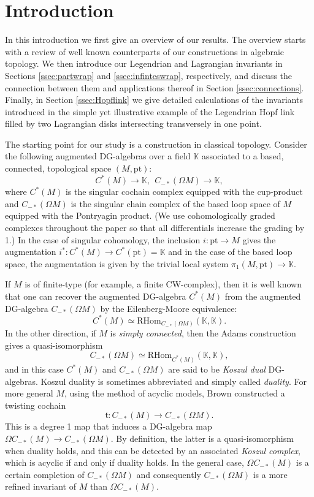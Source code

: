 \documentclass{gtpart}
\newcommand{\K}{\mathbb{K}}
\renewcommand{\t}{\mathfrak{t}}
\begin{document}
\section{Introduction}
In this introduction we first give an overview of our results. The overview starts with a review of
well known counterparts of our constructions in algebraic topology. We then introduce our Legendrian
and Lagrangian invariants in Sections \ref{ssec:partwrap} and \ref{ssec:infinteswrap}, respectively,
and discuss the connection between them and applications thereof in Section \ref{ssec:connections}.  Finally, in Section \ref{ssec:Hopflink} we give detailed calculations of the invariants introduced in the simple yet illustrative example of the Legendrian Hopf link filled by two Lagrangian disks intersecting transversely in one point.
  
The starting point for our study is a construction in classical topology. 
Consider the following augmented DG-algebras over a field $\mathbb{K}$ associated to a based, connected, topological space $(M,\mathrm{pt})$: 
\[ C^*(M) \to \K , \ \ C_{-*}(\Omega M) \to \K, \]
where $C^*(M)$ is the singular cochain complex equipped with the cup-product and $C_{-*}(\Omega M)$
is the singular chain complex of the based loop space of $M$ equipped with the Pontryagin product. (We use
cohomologically graded complexes throughout the paper so that all differentials increase the grading by 1.) In the case of
singular cohomology, the inclusion $i\colon \mathrm{pt} \to M$  gives the augmentation $i^*\colon C^*(M) \to C^*(\mathrm{pt}) = \K$ and
in the case of the based loop space, the augmentation is given by the trivial local system $\pi_1(M,\mathrm{pt}) \to \K$. 

If $M$ is of finite-type (for example, a finite CW-complex), then it is well known that one can
recover the augmented DG-algebra $C^*(M)$ from the augmented DG-algebra $C_{-*}(\Omega M)$ by
the Eilenberg-Moore equivalence:
\[ C^*(M) \simeq \mathrm{RHom}_{C_{-*}(\Omega M)} (\K, \K). \] 
In the other direction, if $M$ is \emph{simply connected}, then the Adams construction gives a quasi-isomorphism 
\[ C_{-*}(\Omega M) \simeq \mathrm{RHom}_{C^*(M)} (\K,\K), \]
and in this case $C^*(M)$ and $C_{-*}(\Omega M)$ are
said to be \emph{Koszul dual} DG-algebras. 
Koszul duality is sometimes abbreviated and simply called
\emph{duality}. 
For more general $M$, using the method of acyclic models, Brown \cite{brown} constructed a twisting cochain
\[ \t \colon C_{-*}(M) \to C_{-*}(\Omega M). \]
This is a degree 1 map that induces a DG-algebra map $\Omega C_{-*}(M) \to C_{-*}(\Omega M)$.
By definition, the latter is a
quasi-isomorphism when duality holds, and this can be detected by an associated \emph{Koszul complex}, which
is acyclic if and only if duality holds. In the general case, $\Omega C_{-*}(M)$ is a certain completion of $C_{-*}(\Omega M)$ and consequently $C_{-*}(\Omega M)$ is a more refined invariant of $M$ than $\Omega C_{-*}(M)$. 
\end{document}
